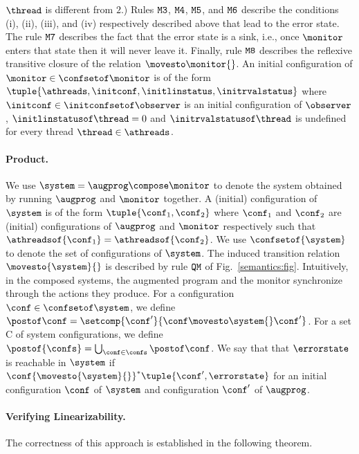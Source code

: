 $\thread$ is different from $2$.)
%
Rules 
${\tt M3}$,
${\tt M4}$,
${\tt M5}$, and
${\tt M6}$
describe the conditions (i), (ii), (iii), and (iv)
respectively described
above that lead to the error state.
%
The rule ${\tt M7}$ describes the fact that the error state is a sink,
i.e., once $\monitor$ enters that state then it will never leave it.
%
Finally, rule ${\tt M8}$ describes the reflexive transitive closure of
the relation $\movesto\monitor{}$.
%
An initial configuration of $\monitor\in\confsetof\monitor$
is of the form $\tuple{\athreads,\initconf,\initlinstatus,\initrvalstatus}$
where $\initconf\in\initconfsetof\observer$ is an initial 
configuration of $\observer$,
$\initlinstatusof\thread=0$ and 
$\initrvalstatusof\thread$ is undefined for every thread $\thread\in\athreads$.

\paragraph{Product.}
We use $\system=\augprog\compose\monitor$ to denote the system obtained by
running $\augprog$ and $\monitor$ together.
%
A (initial) configuration of $\system$ is of the form
$\tuple{\conf_1,\conf_2}$ where $\conf_1$ and $\conf_2$
are (initial) configurations of $\augprog$ and $\monitor$ respectively
such that $\athreadsof{\conf_1}=\athreadsof{\conf_2}$.
%
%
We use $\confsetof{\system}$ 
to denote the set of configurations
of $\system$.
%
The induced transition relation $\movesto{\system}{}$
is described by
rule ${\tt QM}$ of Fig.~\ref{semantics:fig}.
%
Intuitively, in the composed systems, the augmented program and the monitor
synchronize through the actions they produce.
%
For a configuration $\conf\in\confsetof\system$, we define
$\postof\conf=\setcomp{\conf'}{\conf\movesto\system{}\conf'}$. For a set C of system configurations, we define $\postof{\confs} = \bigcup_{\conf \in \confs} \postof\conf$. 
We say that that $\errorstate$ is reachable in 
$\system$ if
$\conf{\movesto{\system}{}}^*\tuple{\conf',\errorstate}$
for an initial configuration $\conf$ of 
$\system$ and configuration $\conf'$ of $\augprog$.

\paragraph{Verifying Linearizability.}
The correctness of this approach is established in the following theorem.

